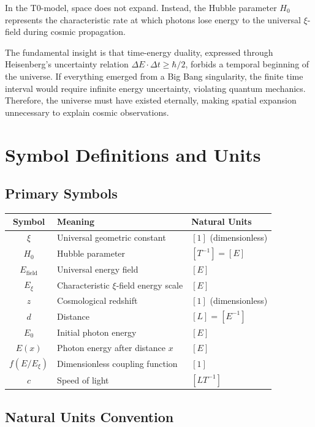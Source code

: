 	\begin{revolutionary}
		In the T0-model, space does not expand. Instead, the Hubble parameter $H_0$ represents the characteristic rate at which photons lose energy to the universal $\xi$-field during cosmic propagation.
	\end{revolutionary}
	
	The fundamental insight is that time-energy duality, expressed through Heisenberg's uncertainty relation $\Delta E \cdot \Delta t \geq \hbar/2$, forbids a temporal beginning of the universe. If everything emerged from a Big Bang singularity, the finite time interval would require infinite energy uncertainty, violating quantum mechanics. Therefore, the universe must have existed eternally, making spatial expansion unnecessary to explain cosmic observations.
	
	\section{Symbol Definitions and Units}
	
	\subsection{Primary Symbols}
	
	\begin{longtable}{|c|l|l|}
		\hline
		\textbf{Symbol} & \textbf{Meaning} & \textbf{Natural Units} \\
		\hline
		$\xi$ & Universal geometric constant & $[1]$ (dimensionless) \\
		$H_0$ & Hubble parameter & $[T^{-1}] = [E]$ \\
		$E_{\text{field}}$ & Universal energy field & $[E]$ \\
		$E_\xi$ & Characteristic $\xi$-field energy scale & $[E]$ \\
		$z$ & Cosmological redshift & $[1]$ (dimensionless) \\
		$d$ & Distance & $[L] = [E^{-1}]$ \\
		$E_0$ & Initial photon energy & $[E]$ \\
		$E(x)$ & Photon energy after distance $x$ & $[E]$ \\
		$f(E/E_\xi)$ & Dimensionless coupling function & $[1]$ \\
		$c$ & Speed of light & $[LT^{-1}]$ \\
		\hline
	\end{longtable}
\normalsize
	
	\subsection{Natural Units Convention}
	
